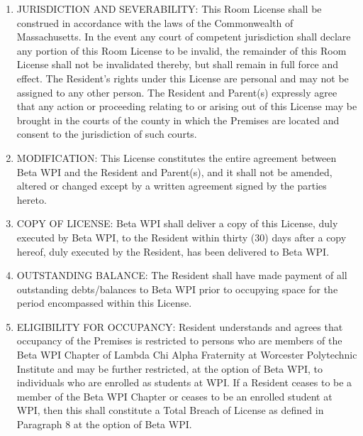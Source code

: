 \documentclass[legalpaper, 12pt]{article}
\begin{document}
\begin{enumerate}
        \item JURISDICTION AND SEVERABILITY\@: This Room License shall be
                construed in accordance with the laws of the Commonwealth of
                Massachusetts.  In the event any court of competent jurisdiction
                shall declare any portion of this Room License to be invalid,
                the remainder of this Room License shall not be invalidated
                thereby, but shall remain in full force and effect.  The
                Resident’s rights under this License are personal and may not be
                assigned to any other person.  The Resident and Parent(s)
                expressly agree that any action or proceeding relating to or
                arising out of this License may be brought in the courts of the
                county in which the Premises are located and consent to the
                jurisdiction of such courts.

        \item MODIFICATION\@: This License constitutes the entire agreement
                between Beta WPI and the Resident and Parent(s), and it shall
                not be amended, altered or changed except by a written agreement
                signed by the parties hereto.
        
        \item COPY OF LICENSE\@: Beta WPI shall deliver a copy of this License,
                duly executed by Beta WPI, to the Resident within thirty (30)
                days after a copy hereof, duly executed by the Resident, has
                been delivered to Beta WPI\@.

        \item OUTSTANDING BALANCE\@: The Resident shall have made payment of all
                outstanding debts/balances to Beta WPI prior to occupying space
                for the period encompassed within this License.

        \item ELIGIBILITY FOR OCCUPANCY\@: Resident understands and agrees that
                occupancy of the Premises is restricted to persons who are
                members of the Beta WPI Chapter of Lambda Chi Alpha Fraternity
                at Worcester Polytechnic Institute and may be further
                restricted, at the option of Beta WPI, to individuals who are
                enrolled as students at WPI\@. If a Resident ceases to be a
                member of the Beta WPI Chapter or ceases to be an enrolled
                student at WPI, then this shall constitute a Total Breach of
                License as defined in Paragraph 8 at the option of Beta WPI\@.


\end{enumerate}
\end{document}
